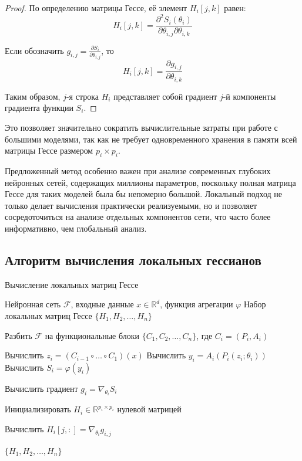 \documentclass[a4paper,12pt]{article}
\begin{document}
\begin{proof}
  По определению матрицы Гессе, её элемент $H_i[j,k]$ равен:
  \begin{equation}
    H_i[j,k] = \frac{\partial^2 S_i(\theta_i)}{\partial \theta_{i,j} \partial \theta_{i,k}}
  \end{equation}

  Если обозначить $g_{i,j} = \frac{\partial S_i}{\partial \theta_{i,j}}$, то
  \begin{equation}
    H_i[j,k] = \frac{\partial g_{i,j}}{\partial \theta_{i,k}}
  \end{equation}

  Таким образом, $j$-я строка $H_i$ представляет собой градиент $j$-й компоненты градиента функции $S_i$.
\end{proof}

Это позволяет значительно сократить вычислительные затраты при работе с большими моделями, так как не требует
одновременного хранения в памяти всей матрицы Гессе размером $p_i \times p_i$.

Предложенный метод особенно важен при анализе современных глубоких нейронных сетей, содержащих миллионы
параметров, поскольку полная матрица Гессе для таких моделей была бы непомерно большой. Локальный подход не
только делает вычисления практически реализуемыми, но и позволяет сосредоточиться на анализе отдельных
компонентов сети, что часто более информативно, чем глобальный анализ.

\subsection{Алгоритм вычисления локальных гессианов}

\begin{algorithm}
  \caption{Вычисление локальных матриц Гессе}
  \begin{algorithmic}[1]
    \Require Нейронная сеть $\mathcal{F}$, входные данные $x \in \mathbb{R}^d$, функция агрегации $\varphi$
    \Ensure Набор локальных матриц Гессе $\{H_1, H_2, \ldots, H_n\}$

    \State Разбить $\mathcal{F}$ на функциональные блоки $\{C_1, C_2, \ldots, C_n\}$, где $C_i = (P_i, A_i)$

    \State Вычислить $z_i = (C_{i-1} \circ \ldots \circ C_1)(x)$ 
    \State Вычислить $y_i = A_i(P_i(z_i; \theta_i))$ 
    \State Вычислить $S_i = \varphi(y_i)$ 

    \State Вычислить градиент $g_i = \nabla_{\theta_i} S_i$

    \State Инициализировать $H_i \in \mathbb{R}^{p_i \times p_i}$ нулевой матрицей

    \State Вычислить $H_i[j,:] = \nabla_{\theta_i} g_{i,j}$
    \EndIf
    \EndFor
    \EndFor

    \State \Return $\{H_1, H_2, \ldots, H_n\}$
  \end{algorithmic}
\end{algorithm}
\end{document}
